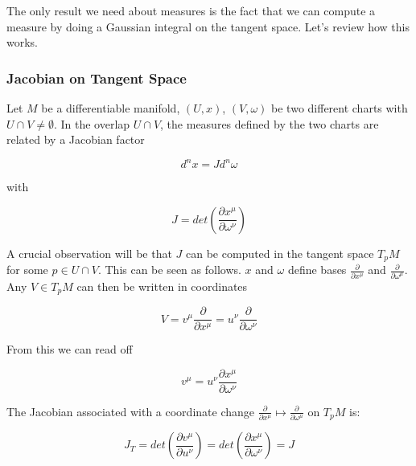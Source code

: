 The only result we need about measures is the fact that we can compute a measure by doing a Gaussian integral on the tangent space. Let's review how this works.


\subsubsection{Jacobian on Tangent Space}

    Let $M$ be a differentiable manifold, $(U, x)$, $(V, \omega)$ be two different charts with $U \cap V \ne \emptyset$. In the overlap $U \cap V$, the measures defined by the two charts are related by a Jacobian factor

    \begin{equation}
        d^n x = J d^n \omega
    \end{equation}

    with

    \begin{equation}
        J = det \left( \frac{\partial x^\mu}{\partial \omega^\nu} \right)
    \end{equation}

    A crucial observation will be that $J$ can be computed in the tangent space $T_p M$ for some $p \in U \cap V$. This can be seen as follows. $x$ and $\omega$ define bases $\frac{\partial}{\partial x^\mu}$ and $\frac{\partial}{\partial \omega^\mu}$. Any $V \in T_p M$ can then be written in coordinates

    \begin{equation}
        V = v^\mu \frac{\partial}{\partial x^\mu} = u^\nu \frac{\partial}{\partial \omega^\nu}
    \end{equation}

    From this we can read off

    \begin{equation}
        v^\mu = u^\nu \frac{\partial x^\mu}{\partial \omega^\nu}
        \label{eq:tangent-coords}
    \end{equation}

    The Jacobian associated with a coordinate change $\frac{\partial}{\partial x^\mu} \mapsto \frac{\partial}{\partial \omega^\mu}$ on $T_pM$ is:

    \begin{equation}
        J_T = det\left( \frac{\partial v^\mu}{\partial u^\nu} \right) = det \left( \frac{\partial x^\mu}{\partial \omega^\nu} \right) = J
    \end{equation}

